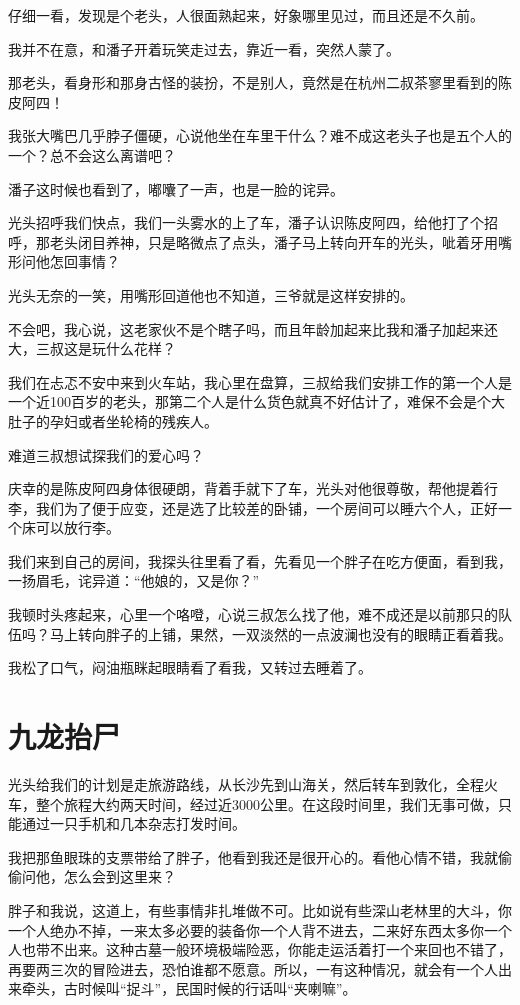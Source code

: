 仔细一看，发现是个老头，人很面熟起来，好象哪里见过，而且还是不久前。

我并不在意，和潘子开着玩笑走过去，靠近一看，突然人蒙了。

那老头，看身形和那身古怪的装扮，不是别人，竟然是在杭州二叔茶寥里看到的陈皮阿四！

我张大嘴巴几乎脖子僵硬，心说他坐在车里干什么？难不成这老头子也是五个人的一个？总不会这么离谱吧？

潘子这时候也看到了，嘟囔了一声，也是一脸的诧异。

光头招呼我们快点，我们一头雾水的上了车，潘子认识陈皮阿四，给他打了个招呼，那老头闭目养神，只是略微点了点头，潘子马上转向开车的光头，呲着牙用嘴形问他怎回事情？

光头无奈的一笑，用嘴形回道他也不知道，三爷就是这样安排的。

不会吧，我心说，这老家伙不是个瞎子吗，而且年龄加起来比我和潘子加起来还大，三叔这是玩什么花样？

我们在忐忑不安中来到火车站，我心里在盘算，三叔给我们安排工作的第一个人是一个近100百岁的老头，那第二个人是什么货色就真不好估计了，难保不会是个大肚子的孕妇或者坐轮椅的残疾人。

难道三叔想试探我们的爱心吗？

庆幸的是陈皮阿四身体很硬朗，背着手就下了车，光头对他很尊敬，帮他提着行李，我们为了便于应变，还是选了比较差的卧铺，一个房间可以睡六个人，正好一个床可以放行李。

我们来到自己的房间，我探头往里看了看，先看见一个胖子在吃方便面，看到我，一扬眉毛，诧异道：“他娘的，又是你？”

我顿时头疼起来，心里一个咯噔，心说三叔怎么找了他，难不成还是以前那只的队伍吗？马上转向胖子的上铺，果然，一双淡然的一点波澜也没有的眼睛正看着我。

我松了口气，闷油瓶眯起眼睛看了看我，又转过去睡着了。

\chapter{九龙抬尸}

光头给我们的计划是走旅游路线，从长沙先到山海关，然后转车到敦化，全程火车，整个旅程大约两天时间，经过近3000公里。在这段时间里，我们无事可做，只能通过一只手机和几本杂志打发时间。

我把那鱼眼珠的支票带给了胖子，他看到我还是很开心的。看他心情不错，我就偷偷问他，怎么会到这里来？

胖子和我说，这道上，有些事情非扎堆做不可。比如说有些深山老林里的大斗，你一个人绝办不掉，一来太多必要的装备你一个人背不进去，二来好东西太多你一个人也带不出来。这种古墓一般环境极端险恶，你能走运活着打一个来回也不错了，再要两三次的冒险进去，恐怕谁都不愿意。所以，一有这种情况，就会有一个人出来牵头，古时候叫“捉斗”，民国时候的行话叫“夹喇嘛”。

